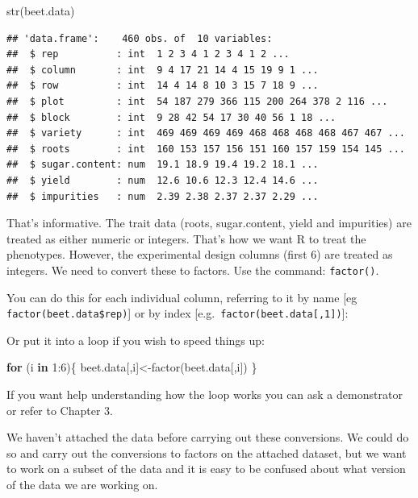 \documentclass[
]{book}
\makeatletter
\newenvironment{Shaded}{\begin{snugshade}}{\end{snugshade}}
\newcommand{\ControlFlowTok}[1]{\textcolor[rgb]{0.13,0.29,0.53}{\textbf{#1}}}
\newcommand{\DecValTok}[1]{\textcolor[rgb]{0.00,0.00,0.81}{#1}}
\newcommand{\FunctionTok}[1]{\textcolor[rgb]{0.00,0.00,0.00}{#1}}
\newcommand{\NormalTok}[1]{#1}
\newcommand{\OtherTok}[1]{\textcolor[rgb]{0.56,0.35,0.01}{#1}}
\newcommand{\SpecialCharTok}[1]{\textcolor[rgb]{0.00,0.00,0.00}{#1}}
\newenvironment{kframe}{%
\medskip{}
\setlength{\fboxsep}{.8em}
 \def\at@end@of@kframe{}%
 \ifinner\ifhmode%
  \def\at@end@of@kframe{\end{minipage}}%
  \begin{minipage}{\columnwidth}%
 \fi\fi%
 \def\FrameCommand##1{\hskip\@totalleftmargin \hskip-\fboxsep
 \colorbox{shadecolor}{##1}\hskip-\fboxsep
     \hskip-\linewidth \hskip-\@totalleftmargin \hskip\columnwidth}%
 \MakeFramed {\advance\hsize-\width
   \@totalleftmargin\z@ \linewidth\hsize
   \@setminipage}}%
 {\par\unskip\endMakeFramed%
 \at@end@of@kframe}
\newenvironment{rmdblock}[1]
  {
  \begin{itemize}
  \renewcommand{\labelitemi}{
    \raisebox{-.7\height}[0pt][0pt]{
      {\setkeys{Gin}{width=3em,keepaspectratio}\texttt{[image: images/\#1]}}
    }
  }
  \setlength{\fboxsep}{1em}
  \begin{kframe}
  \item
  }
  {
  \end{kframe}
  \end{itemize}
  }
\newenvironment{rmdnote}
  {\begin{rmdblock}{note}}
  {\end{rmdblock}}
\makeatother
\begin{document}
\begin{Shaded}
\begin{Highlighting}[]
\FunctionTok{str}\NormalTok{(beet.data)}
\end{Highlighting}
\end{Shaded}

\begin{verbatim}
## 'data.frame':    460 obs. of  10 variables:
##  $ rep          : int  1 2 3 4 1 2 3 4 1 2 ...
##  $ column       : int  9 4 17 21 14 4 15 19 9 1 ...
##  $ row          : int  14 4 14 8 10 3 15 7 18 9 ...
##  $ plot         : int  54 187 279 366 115 200 264 378 2 116 ...
##  $ block        : int  9 28 42 54 17 30 40 56 1 18 ...
##  $ variety      : int  469 469 469 469 468 468 468 468 467 467 ...
##  $ roots        : int  160 153 157 156 151 160 157 159 154 145 ...
##  $ sugar.content: num  19.1 18.9 19.4 19.2 18.1 ...
##  $ yield        : num  12.6 10.6 12.3 12.4 14.6 ...
##  $ impurities   : num  2.39 2.38 2.37 2.37 2.29 ...
\end{verbatim}

That's informative. The trait data (roots, sugar.content, yield and impurities) are treated as either numeric or integers. That's how we want R to treat the phenotypes. However, the experimental design columns (first 6) are treated as integers. We need to convert these to factors. Use the command: \texttt{factor()}.

You can do this for each individual column, referring to it by name {[}eg \texttt{factor(beet.data\$rep)}{]} or by index {[}e.g.~\texttt{factor(beet.data{[},1{]})}{]}:

Or put it into a loop if you wish to speed things up:

\begin{Shaded}
\begin{Highlighting}[]
\ControlFlowTok{for}\NormalTok{ (i }\ControlFlowTok{in} \DecValTok{1}\SpecialCharTok{:}\DecValTok{6}\NormalTok{)\{}
\NormalTok{   beet.data[,i]}\OtherTok{\textless{}{-}}\FunctionTok{factor}\NormalTok{(beet.data[,i])}
\NormalTok{\} }
\end{Highlighting}
\end{Shaded}

If you want help understanding how the loop works you can ask a demonstrator or refer to Chapter 3.

\begin{rmdnote}
We haven't attached the data before carrying out these conversions. We could do so and carry out the conversions to factors on the attached dataset, but we want to work on a subset of the data and it is easy to be confused about what version of the data we are working on.
\end{rmdnote}
\end{document}
